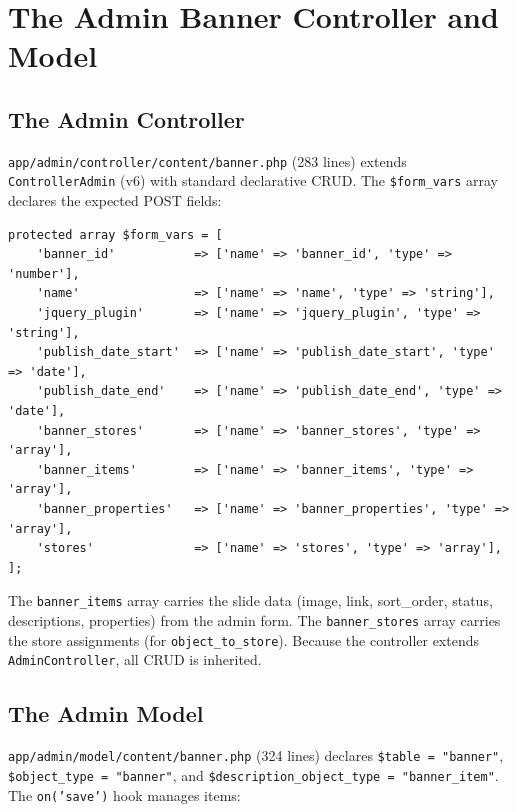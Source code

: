 \documentclass[11pt,a4paper]{article}
\begin{document}
\section{The Admin Banner Controller and Model}\label{sec:admin}

\subsection{The Admin Controller}

\texttt{app/admin/controller/content/banner.php} (283 lines) extends
\texttt{ControllerAdmin} (v6) with standard declarative CRUD. The
\texttt{\$form\_vars} array declares the expected POST fields:

\begin{lstlisting}[caption={\texttt{ControllerContentBanner} --- declarative form vars (abridged).},label={lst:banner-form-vars}]
protected array $form_vars = [
    'banner_id'           => ['name' => 'banner_id', 'type' => 'number'],
    'name'                => ['name' => 'name', 'type' => 'string'],
    'jquery_plugin'       => ['name' => 'jquery_plugin', 'type' => 'string'],
    'publish_date_start'  => ['name' => 'publish_date_start', 'type' => 'date'],
    'publish_date_end'    => ['name' => 'publish_date_end', 'type' => 'date'],
    'banner_stores'       => ['name' => 'banner_stores', 'type' => 'array'],
    'banner_items'        => ['name' => 'banner_items', 'type' => 'array'],
    'banner_properties'   => ['name' => 'banner_properties', 'type' => 'array'],
    'stores'              => ['name' => 'stores', 'type' => 'array'],
];
\end{lstlisting}

The \texttt{banner\_items} array carries the slide data (image, link,
sort\_order, status, descriptions, properties) from the admin form.
The \texttt{banner\_stores} array carries the store assignments (for
\texttt{object\_to\_store}). Because the controller extends
\texttt{AdminController}, all CRUD is inherited.

\subsection{The Admin Model}

\texttt{app/admin/model/content/banner.php} (324 lines) declares
\texttt{\$table = "banner"}, \texttt{\$object\_type = "banner"}, and
\texttt{\$description\_object\_type = "banner\_item"}. The
\texttt{on('save')} hook manages items:
\end{document}
